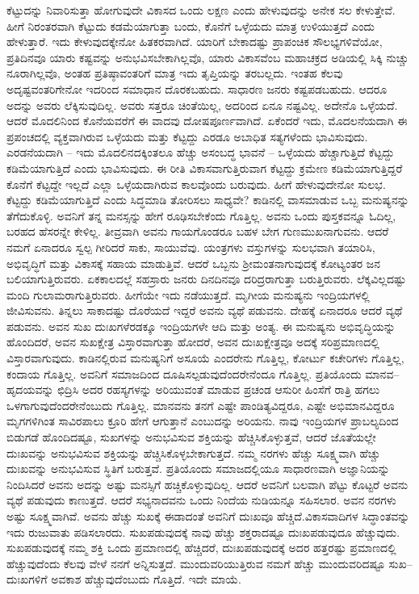 ಕೆಟ್ಟುದನ್ನು ನಿವಾರಿಸುತ್ತಾ ಹೋಗುವುದೇ ವಿಕಾಸದ ಒಂದು ಲಕ್ಷಣ ಎಂದು ಹೇಳುವುದನ್ನು ಅನೇಕ ಸಲ ಕೇಳುತ್ತೇವೆ. ಹೀಗೆ ನಿರಂತರವಾಗಿ ಕೆಟ್ಟುದು ಕಡಮೆಯಾಗುತ್ತಾ ಬಂದು, ಕೊನೆಗೆ ಒಳ್ಳೆಯದು ಮಾತ್ರ ಉಳಿಯುತ್ತದೆ ಎಂದು ಹೇಳುತ್ತಾರೆ. ಇದು ಕೇಳುವುದಕ್ಕೇನೋ ಹಿತಕರವಾಗಿದೆ. ಯಾರಿಗೆ ಬೇಕಾದಷ್ಟು ಪ್ರಾಪಂಚಿಕ ಸೌಲಭ್ಯಗಳಿವೆಯೋ, ಪ್ರತಿದಿನವೂ ಯಾರು ಕಷ್ಟವನ್ನು ಅನುಭವಿಸಬೇಕಾಗಿಲ್ಲವೊ, ಯಾರು ವಿಕಾಸವೆಂಬ ಮಹಾಚಕ್ರದ ಅಡಿಯಲ್ಲಿ ಸಿಕ್ಕಿ ನುಚ್ಚು ನೂರಾಗಿಲ್ಲವೊ, ಅಂತಹ ಪ್ರತಿಷ್ಠಾವಂತರಿಗೆ ಮಾತ್ರ ಇದು ತೃಪ್ತಿಯನ್ನು ತರಬಲ್ಲದು. ಇಂತಹ ಕೆಲವು ಅದೃಷ್ಟವಂತರಿಗೇನೋ ಇದರಿಂದ ಸಮಾಧಾನ ದೊರಕಬಹುದು. ಸಾಧಾರಣ ಜನರು ಕಷ್ಟಪಡಬಹುದು. ಆದರೂ ಅದನ್ನು ಅವರು ಲೆಕ್ಕಿಸುವುದಿಲ್ಲ. ಅವರು ಸತ್ತರೂ ಚಿಂತೆಯಿಲ್ಲ, ಅದರಿಂದ ಏನೂ ನಷ್ಟವಿಲ್ಲ. ಅದೇನೊ ಒಳ್ಳೆಯದೆ. ಆದರೆ ಮೊದಲಿನಿಂದ ಕೊನೆಯವರೆಗೆ ಈ ವಾದವು ದೋಷಪೂರ್ಣವಾಗಿದೆ. ಏಕೆಂದರೆ ಇದು, ಮೊದಲನೆಯದಾಗಿ ಈ ಪ್ರಪಂಚದಲ್ಲಿ ವ್ಯಕ್ತವಾಗಿರುವ ಒಳ್ಳೆಯದು ಮತ್ತು ಕೆಟ್ಟದ್ದು ಎರಡೂ ಅಬಾಧಿತ ಸತ್ಯಗಳೆಂದು ಭಾವಿಸುವುದು. ಎರಡನೆಯದಾಗಿ – ಇದು ಮೊದಲಿನದಕ್ಕಿಂತಲೂ ಹೆಚ್ಚು ಅಸಂಬದ್ಧ ಭಾವನೆ – ಒಳ್ಳೆಯದು ಹೆಚ್ಚಾಗುತ್ತಿದೆ ಕೆಟ್ಟದ್ದು ಕಡಿಮೆಯಾಗುತ್ತಿದೆ ಎಂದು ಭಾವಿಸುವುದು. ಈ ರೀತಿ ವಿಕಾಸವಾಗುತ್ತಿರುವಾಗ ಕೆಟ್ಟದ್ದು ಕ್ರಮೇಣ ಕಡಿಮೆಯಾಗುತ್ತಿದ್ದರೆ ಕೊನೆಗೆ ಕೆಟ್ಟದ್ದೇ ಇಲ್ಲದೆ ಎಲ್ಲಾ ಒಳ್ಳೆಯದಾಗಿರುವ ಕಾಲವೊಂದು ಬರುವುದು. ಹೀಗೆ ಹೇಳುವುದೇನೋ ಸುಲಭ. ಕೆಟ್ಟದ್ದು ಕಡಿಮೆಯಾಗುತ್ತಿದೆ ಎಂದು ಸಿದ್ಧಮಾಡಿ ತೋರಿಸಲು ಸಾಧ್ಯವೇ? ಕಾಡಿನಲ್ಲಿ ವಾಸಮಾಡುವ ಒಬ್ಬ ಮನುಷ್ಯನನ್ನು ತೆಗೆದುಕೊಳ್ಳಿ. ಅವನಿಗೆ ತನ್ನ ಮನಸ್ಸನ್ನು ಹೇಗೆ ರೂಢಿಸಬೇಕೆಂದು ಗೊತ್ತಿಲ್ಲ. ಅವನು ಒಂದು ಪುಸ್ತಕವನ್ನೂ ಓದಿಲ್ಲ, ಬರಹದ ಹೆಸರನ್ನೇ ಕೇಳಿಲ್ಲ. ತೀವ್ರವಾಗಿ ಅವನು ಗಾಯಗೊಂಡರೂ ಬಹಳ ಬೇಗ ಗುಣಮುಖನಾಗುವನು. ಆದರೆ ನಮಗೆ ಏನಾದರೂ ಸ್ವಲ್ಪ ಗೀರಿದರೆ ಸಾಕು, ಸಾಯುವೆವು. ಯಂತ್ರಗಳು ವಸ್ತುಗಳನ್ನು ಸುಲಭವಾಗಿ ತಯಾರಿಸಿ, ಅಭಿವೃದ್ಧಿಗೆ ಮತ್ತು ವಿಕಾಸಕ್ಕೆ ಸಹಾಯ ಮಾಡುತ್ತಿವೆ. ಆದರೆ ಒಬ್ಬನು ಶ‍್ರೀಮಂತನಾಗುವುದಕ್ಕೆ ಕೋಟ್ಯಂತರ ಜನ ಬಲಿಯಾಗುತ್ತಿರುವರು. ಏಕಕಾಲದಲ್ಲೆ ಸಹಸ್ರಾರು ಜನರು ದಿನದಿನವೂ ದರಿದ್ರರಾಗುತ್ತಾ ಬರುತ್ತಿರುವರು. ಲೆಕ್ಕವಿಲ್ಲದಷ್ಟು ಮಂದಿ ಗುಲಾಮರಾಗುತ್ತಿರುವರು. ಹೀಗೆಯೇ ಇದು ನಡೆಯುತ್ತದೆ. ಮೃಗೀಯ ಮನುಷ್ಯನು ಇಂದ್ರಿಯಗಳಲ್ಲಿ ಜೀವಿಸುವನು. ತಿನ್ನಲು ಸಾಕಾದಷ್ಟು ದೊರೆಯದೆ ಇದ್ದರೆ ಅವನು ವ್ಯಥೆ ಪಡುವನು. ದೇಹಕ್ಕೆ ಏನಾದರೂ ಆದರೆ ವ್ಯಥೆ ಪಡುವನು. ಅವನ ಸುಖ ದುಃಖಗಳೆರಡಕ್ಕೂ ಇಂದ್ರಿಯಗಳೇ ಆದಿ ಮತ್ತು ಅಂತ್ಯ. ಈ ಮನುಷ್ಯನು ಅಭಿವೃದ್ಧಿಯನ್ನು ಹೊಂದಿದರೆ, ಅವನ ಸುಖಕ್ಷೇತ್ರ ವಿಸ್ತಾರವಾಗುತ್ತಾ ಹೋದರೆ, ಅವನ ದುಃಖಕ್ಷೇತ್ರವೂ ಅದಕ್ಕೆ ಸರಿಪ್ರಮಾಣದಲ್ಲಿ ವಿಸ್ತಾರವಾಗುವುದು. ಕಾಡಿನಲ್ಲಿರುವ ಮನುಷ್ಯನಿಗೆ ಅಸೂಯೆ ಎಂದರೇನು ಗೊತ್ತಿಲ್ಲ, ಕೋರ್ಟು ಕಚೇರಿಗಳು ಗೊತ್ತಿಲ್ಲ, ಕಂದಾಯ ಗೊತ್ತಿಲ್ಲ. ಅವನಿಗೆ ಸಮಾಜದಿಂದ ದೂಷಿಸಲ್ಪಡುವುದೆಂದರೇನೆಂದೂ ಗೊತ್ತಿಲ್ಲ. ಪ್ರತಿಯೊಂದು ಮಾನವ–ಹೃದಯವನ್ನು ಛಿದ್ರಿಸಿ ಅದರ ರಹಸ್ಯಗಳನ್ನು ಅರಿಯುವಂತೆ ಮಾಡುವ ಪ್ರಚಂಡ ಆಸುರೀ ಹಿಂಸೆಗೆ ರಾತ್ರಿ ಹಗಲು ಒಳಗಾಗುವುದೆಂದರೇನೆಂಬುದು ಗೊತ್ತಿಲ್ಲ. ಮಾನವನು ತನಗೆ ಎಷ್ಟೇ ಪಾಂಡಿತ್ಯವಿದ್ದರೂ, ಎಷ್ಟೇ ಅಭಿಮಾನವಿದ್ದರೂ ಮೃಗಗಳಿಗಿಂತ ಸಾವಿರಪಾಲು ಕ್ರೂರಿ ಹೇಗೆ ಆಗುತ್ತಾನೆ ಎಂಬುದನ್ನು ಅರಿಯನು. ನಾವು ಇಂದ್ರಿಯಗಳ ಪ್ರಾಬಲ್ಯದಿಂದ ಬಿಡುಗಡೆ ಹೊಂದಿದಷ್ಟೂ, ಸುಖಗಳನ್ನು ಅನುಭವಿಸುವ ಶಕ್ತಿಯನ್ನು ಹೆಚ್ಚಿಸಿಕೊಳ್ಳುತ್ತವೆ, ಆದರೆ ಜೊತೆಯಲ್ಲೇ ದುಃಖವನ್ನು ಅನುಭವಿಸುವ ಶಕ್ತಿಯನ್ನು ಹೆಚ್ಚಿಸಿಕೊಳ್ಳಬೇಕಾಗುತ್ತದೆ. ನಮ್ಮ ನರಗಳು ಹೆಚ್ಚು ಸೂಕ್ಷ್ಮವಾಗಿ ಹೆಚ್ಚು ದುಃಖವನ್ನು ಅನುಭವಿಸುವ ಸ್ಥಿತಿಗೆ ಬರುತ್ತವೆ. ಪ್ರತಿಯೊಂದು ಸಮಾಜದಲ್ಲಿಯೂ ಸಾಧಾರಣವಾಗಿ ಅಜ್ಞಾನಿಯನ್ನು ನಿಂದಿಸಿದರೆ ಅವನು ಅದನ್ನು ಅಷ್ಟು ಮನಸ್ಸಿಗೆ ಹಚ್ಚಿಕೊಳ್ಳುವುದಿಲ್ಲ. ಆದರೆ ಅವನಿಗೆ ಬಲವಾಗಿ ಪೆಟ್ಟು ಕೊಟ್ಟರೆ ಅವನು ವ್ಯಥೆ ಪಡುವುದು ಕಾಣುತ್ತದೆ. ಆದರೆ ಸಭ್ಯನಾದವನು ಒಂದು ನಿಂದೆಯ ನುಡಿಯನ್ನೂ ಸಹಿಸಲಾರ. ಅವನ ನರಗಳು ಅಷ್ಟು ಸೂಕ್ಷ್ಮವಾಗಿವೆ. ಅವನು ಹೆಚ್ಚು ಸುಖಕ್ಕೆ ಈಡಾದಂತೆ ಅವನಿಗೆ ದುಃಖವೂ ಹೆಚ್ಚಿದೆ.\break ವಿಕಾಸವಾದಿಗಳ ಸಿದ್ಧಾಂತವನ್ನು ಇದು ರುಜುವಾತು ಪಡಿಸಲಾರದು. ಸುಖಪಡುವುದಕ್ಕೆ ನಾವು ಹೆಚ್ಚು ಶಕ್ತರಾದಷ್ಟೂ ದುಃಖಪಡುವುದೂ ಹೆಚ್ಚುವುದು. ಸುಖಪಡುವುದಕ್ಕೆ ನಮ್ಮ ಶಕ್ತಿ ಒಂದು ಪ್ರಮಾಣದಲ್ಲಿ ಹೆಚ್ಚಿದರೆ, ದುಃಖಪಡುವುದಕ್ಕೆ ಅದರ ಹತ್ತರಷ್ಟು ಪ್ರಮಾಣದಲ್ಲಿ ಹೆಚ್ಚುವುದೆಂದು ಕೆಲವು ವೇಳೆ ನನಗೆ ಅನ್ನಿಸುತ್ತದೆ. ಮುಂದುವರಿಯುತ್ತಿರುವ ನಮಗೆ ಹೆಚ್ಚು ಮುಂದುವರಿದಷ್ಟೂ ಸುಖ–ದುಃಖಗಳಿಗೆ ಅವಕಾಶ ಹೆಚ್ಚುವುದೆಂಬುದು ಗೊತ್ತಿದೆ. ಇದೇ ಮಾಯೆ.


